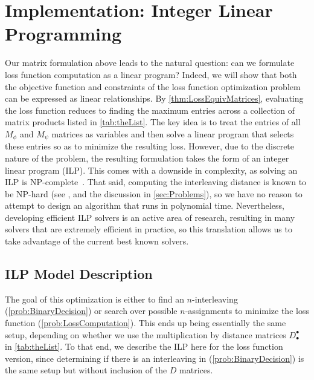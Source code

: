 \section{Implementation: Integer Linear Programming}
\label{sec:ILP}

Our matrix formulation above leads to the natural question: can we formulate loss function computation as a linear program?
Indeed, we will show that both the objective function and constraints
of the loss function optimization problem can be expressed as linear relationships.
By \cref{thm:LossEquivMatrices}, evaluating the loss function reduces to finding the maximum entries across a collection of matrix products listed in \cref{tab:theList}. The key idea is to treat the entries of all $M_\phi$ and $M_\psi$ matrices as variables and then solve a linear program that selects these entries so as to minimize the resulting loss.
However, due to the discrete nature of the problem, the resulting formulation takes the form of an integer linear program (ILP). 
This comes with a downside in complexity, as solving an ILP is NP-complete~\cite[Pg.~245]{Garey1979}.
That said, computing the interleaving distance is known to be NP-hard (see \cite{bjerkevik2017computational,bjerkevik2020computing}, and the discussion in \cref{sec:Problems}), so we have no reason to attempt to design an algorithm that runs in polynomial time. 
Nevertheless, developing efficient ILP solvers is an active area of research, resulting in many solvers that are extremely efficient in practice, so this translation allows us to take advantage of the current best known solvers. 

\subsection{ILP Model Description}
\label{ssec:ILP_model_description}
%
The goal of this optimization is either to find an $n$-interleaving (\cref{prob:BinaryDecision}) or search over possible $n$-assignments   to minimize the loss function (\cref{prob:LossComputation}).
This ends up being essentially the same setup, depending on whether we use the multiplication by distance matrices $D_\bullet^\bullet$ in \cref{tab:theList}. 
To that end, we describe the ILP here for the loss function version, since determining if there is an interleaving in (\cref{prob:BinaryDecision}) is the same setup but without inclusion of the $D$ matrices. 

